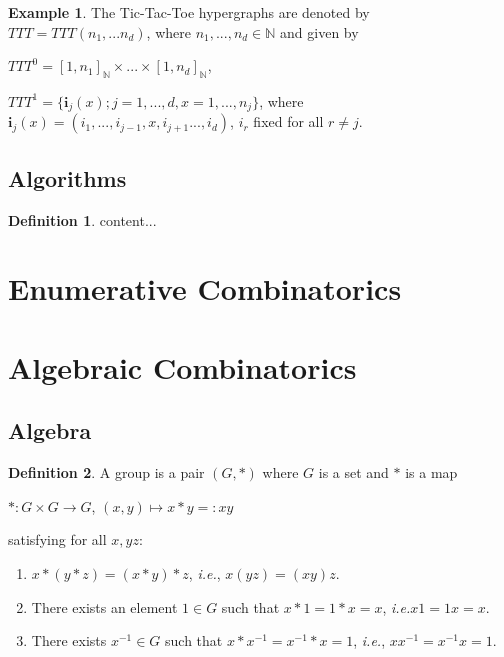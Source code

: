 \documentclass[]{article}
\theoremstyle{definition}
\newtheorem{definition}{Definition}[section]
\theoremstyle{definition}
\newtheorem{exmp}{Example}[section]
\newcommand{\raw}{\rightarrow}
\newcommand{\ie}{\textit{i.e.}}
\newcommand{\bb}{\mathbb}
\newcommand{\mum}{^{-1}}
\begin{document}
\begin{exmp}
	The Tic-Tac-Toe hypergraphs are denoted by $TTT = TTT(n_1, ... n_d)$, where $n_1, ..., n_d \in \bb{N}$ and given by 
	
	\begin{center}
		$TTT^0 = [1, n_1]_{\bb{N}}\times...\times[1, n_d]_{\bb{N}}$,
		
		$TTT^1 = \{ \boldsymbol{i}_j(x); j=1, ..., d, x=1, ..., n_j \}$, where $\boldsymbol{i}_j(x)=(i_1, ..., i_{j-1}, x, i_{j+1} ..., i_d )$, $i_r$ fixed for all $r\neq j$.
	\end{center}

\subsection{Algorithms}

\begin{definition}
	content...
\end{definition}

\end{exmp}

\section{Enumerative Combinatorics}
\section{Algebraic Combinatorics}
\subsection{Algebra}

\begin{definition}
	A group is a pair $(G, *)$ where $G$ is a set and $*$ is a map 
	
	\begin{center}
		$*: G\times G \raw G$, $(x, y) \mapsto x* y =: xy$
	\end{center}
	
	\noindent satisfying for all $x, y z$:
	
	\begin{enumerate}
		\item $x * (y * z) = (x * y) * z$, \ie, $x(yz)=(xy)z$.
		
		\item There exists an element $1 \in G$ such that $x* 1 = 1 * x = x$, \ie $x1 = 1x = x$.
		
		\item There exists $x\mum \in G$ such that $x* x\mum = x\mum * x = 1$, \ie, $xx\mum = x\mum x = 1$.
		
	\end{enumerate}
\end{definition}
\end{document}
